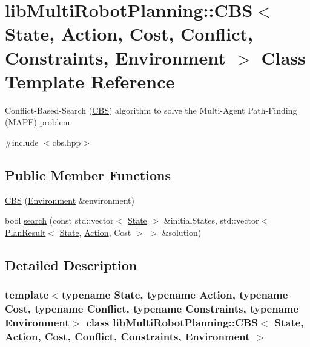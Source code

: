 \hypertarget{classlib_multi_robot_planning_1_1_c_b_s}{}\section{lib\+Multi\+Robot\+Planning\+:\+:C\+BS$<$ State, Action, Cost, Conflict, Constraints, Environment $>$ Class Template Reference}
\label{classlib_multi_robot_planning_1_1_c_b_s}


Conflict-\/\+Based-\/\+Search (\hyperlink{classlib_multi_robot_planning_1_1_c_b_s}{C\+BS}) algorithm to solve the Multi-\/\+Agent Path-\/\+Finding (M\+A\+PF) problem.  




{\ttfamily \#include $<$cbs.\+hpp$>$}

\subsection*{Public Member Functions}
\begin{DoxyCompactItemize}
\item 
\hyperlink{classlib_multi_robot_planning_1_1_c_b_s_ad83ae3366ad3bfc2a7582ca53450ad97}{C\+BS} (\hyperlink{classlib_multi_robot_planning_1_1_environment}{Environment} \&environment)
\item 
bool \hyperlink{classlib_multi_robot_planning_1_1_c_b_s_a09eec524489ee5cfbf66c95a951d7bbe}{search} (const std\+::vector$<$ \hyperlink{structlib_multi_robot_planning_1_1_state}{State} $>$ \&initial\+States, std\+::vector$<$ \hyperlink{structlib_multi_robot_planning_1_1_plan_result}{Plan\+Result}$<$ \hyperlink{structlib_multi_robot_planning_1_1_state}{State}, \hyperlink{namespacelib_multi_robot_planning_aba73fb71693f86a324adfa0e41e1053d}{Action}, Cost $>$ $>$ \&solution)
\end{DoxyCompactItemize}


\subsection{Detailed Description}
\subsubsection*{template$<$typename State, typename Action, typename Cost, typename Conflict, typename Constraints, typename Environment$>$\newline
class lib\+Multi\+Robot\+Planning\+::\+C\+B\+S$<$ State, Action, Cost, Conflict, Constraints, Environment $>$}

